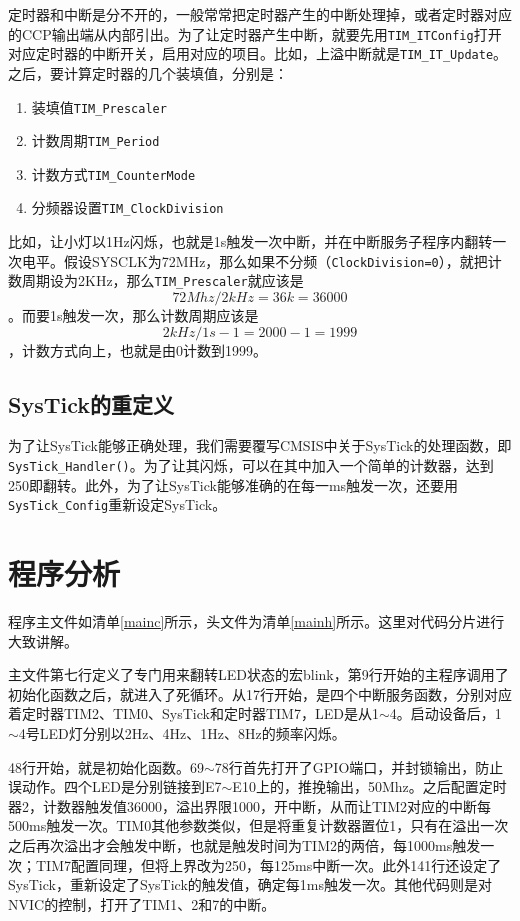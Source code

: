 \documentclass{ctexart}
\begin{document}
定时器和中断是分不开的，一般常常把定时器产生的中断处理掉，或者定时器对应的CCP输出端从内部引出。为了让定时器产生中断，就要先用\lstinline{TIM_ITConfig}打开对应定时器的中断开关，启用对应的项目。比如，上溢中断就是\lstinline{TIM_IT_Update}。之后，要计算定时器的几个装填值，分别是：
\begin{enumerate}
\item 装填值\lstinline{TIM_Prescaler}
\item 计数周期\lstinline{TIM_Period}
\item 计数方式\lstinline{TIM_CounterMode}
\item 分频器设置\lstinline{TIM_ClockDivision}
\end{enumerate}
比如，让小灯以1Hz闪烁，也就是1s触发一次中断，并在中断服务子程序内翻转一次电平。假设SYSCLK为72MHz，那么如果不分频（\lstinline{ClockDivision=0}），就把计数周期设为2KHz，那么\lstinline{TIM_Prescaler}就应该是$$72Mhz / 2kHz = 36k = 36000$$。而要1s触发一次，那么计数周期应该是$$ 2kHz / 1s - 1 = 2000 - 1 = 1999$$，计数方式向上，也就是由0计数到1999。

\subsection{SysTick的重定义}

为了让SysTick能够正确处理，我们需要覆写CMSIS中关于SysTick的处理函数，即\lstinline{SysTick_Handler()}。为了让其闪烁，可以在其中加入一个简单的计数器，达到250即翻转。此外，为了让SysTick能够准确的在每一ms触发一次，还要用\lstinline{SysTick_Config}重新设定SysTick。

\section{程序分析}

程序主文件如清单\ref{mainc}所示，头文件为清单\ref{mainh}所示。这里对代码分片进行大致讲解。

主文件第七行定义了专门用来翻转LED状态的宏blink，第9行开始的主程序调用了初始化函数之后，就进入了死循环。从17行开始，是四个中断服务函数，分别对应着定时器TIM2、TIM0、SysTick和定时器TIM7，LED是从1$\sim$4。启动设备后，1$\sim$4号LED灯分别以2Hz、4Hz、1Hz、8Hz的频率闪烁。

48行开始，就是初始化函数。69$\sim$78行首先打开了GPIO端口，并封锁输出，防止误动作。四个LED是分别链接到E7$\sim$E10上的，推挽输出，50Mhz。之后配置定时器2，计数器触发值36000，溢出界限1000，开中断，从而让TIM2对应的中断每500ms触发一次。TIM0其他参数类似，但是将重复计数器置位1，只有在溢出一次之后再次溢出才会触发中断，也就是触发时间为TIM2的两倍，每1000ms触发一次；TIM7配置同理，但将上界改为250，每125ms中断一次。此外141行还设定了SysTick，重新设定了SysTick的触发值，确定每1ms触发一次。其他代码则是对NVIC的控制，打开了TIM1、2和7的中断。
\end{document}

